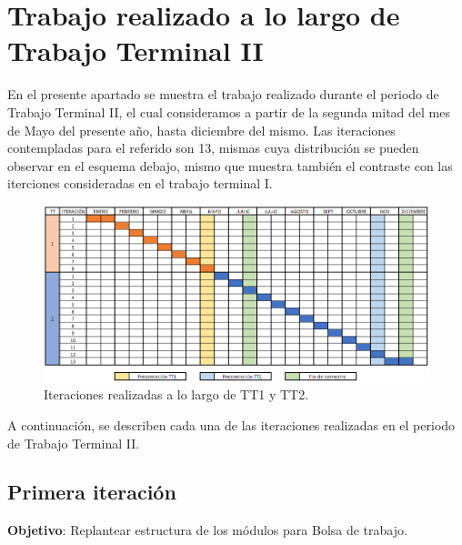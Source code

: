 \section{Trabajo realizado a lo largo de Trabajo Terminal II}

\noindent
En el presente apartado se muestra el trabajo realizado durante el periodo de Trabajo Terminal II, el cual consideramos a partir de la segunda mitad del mes de Mayo del presente año, hasta diciembre del mismo. Las iteraciones contempladas para el referido son 13, mismas cuya distribución se pueden observar en el esquema debajo, mismo que muestra también el contraste con las iterciones consideradas en el trabajo terminal I.

\begin{figure}[!htpb]
	\hypertarget{fig:iteraciones}{\hspace{1pt}}
	\begin{center}
		\includegraphics[width=1\textwidth]{images/reporte/iteraciones.png}
		\caption{Iteraciones realizadas a lo largo de TT1 y TT2.}
		\label{fig:iteraciones}
	\end{center}
\end{figure}

\noindent
A continuación, se describen cada una de las iteraciones realizadas en el periodo de Trabajo Terminal II.

\subsection{Primera iteración}

\noindent
\textbf{Objetivo}: Replantear estructura de los módulos para Bolsa de trabajo.
\newline

